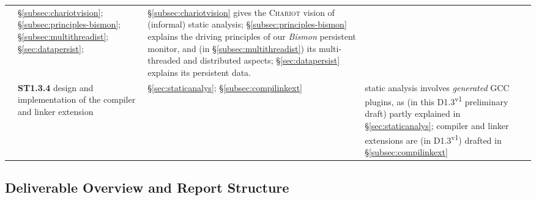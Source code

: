 \begin{table}[!htbp]
\begin{relsize}{-1.3}
\begin{tabular}{|p{}|p{}|p{}|p{}|}
      & §\ref{subsec:chariotvision};  §\ref{subsec:principles-bismon};  §\ref{subsec:multithreadist};  §\ref{sec:datapersist};
      &  §\ref{subsec:chariotvision} gives the \textsc{Chariot} vision of (informal) static analysis;
      §\ref{subsec:principles-bismon} explains the driving principles of our \emph{Bismon} persistent monitor,
      and (in  §\ref{subsec:multithreadist}) its multi-threaded and distributed aspects;
      §\ref{sec:datapersist} explains its persistent data.  \\
      \cline{2-4}
      & \textbf{ST1.3.4} design and implementation of the compiler and linker extension
      & §\ref{sec:staticanalys}; §\ref{subsec:compilinkext}
      & static analysis involves \emph{generated} GCC plugins, as (in this D1.3\textsuperscript{v1} preliminary draft)
      partly explained in §\ref{sec:staticanalys}; compiler and linker extensions
      are (in D1.3\textsuperscript{v1}) drafted in §\ref{subsec:compilinkext}  \\
      \hline
       
      
    \end{tabular}
 \end{relsize}
\end{table}

\subsection{Deliverable Overview and Report Structure}
\label{subsec:overview}

